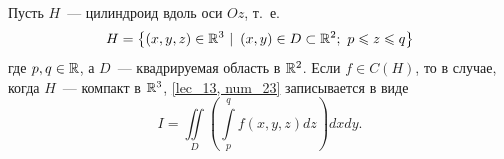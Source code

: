 \documentclass[../../main.tex]{subfiles}
\begin{document}
	
	\begin{thm}
		Пусть $ H $~--- цилиндроид вдоль оси $ Oz $, т.~е. 
		\begin{equation}
		\label{lec14:1}
		H = \left\lbrace \left( x, y, z \right) \in \mathbb{R}^3\ |
		\ \left( x, y \right) \in D \subset \mathbb{R}^2;\ p \leqslant z \leqslant q \right\rbrace
		\end{equation}
		где $ p, q \in \mathbb{R} $, а $ D $~--- квадрируемая область в $ \mathbb{R}^2 $.
		Если $f \in C(H)$, то в случае, когда $H$~--- компакт 
		в $\mathbb{R}^3$, \eqref {lec_13, num_23} записывается в виде
		\begin{equation}
		\label{lec14:2}
		I = \iint\limits_D \left( \int\limits_p^q 
		f \left( x, y, z \right) dz \right) dx dy.
		\end{equation}
	\end{thm}
\end{document}
